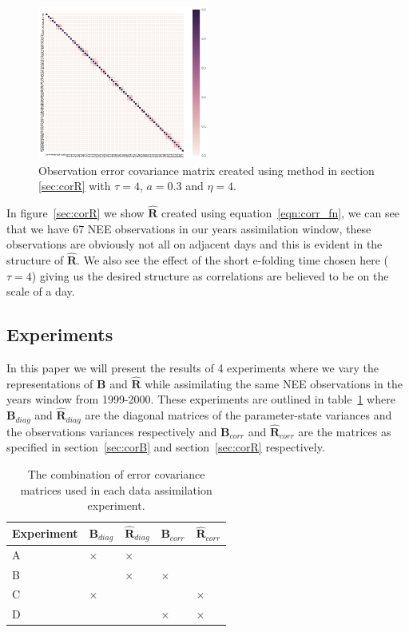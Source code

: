 \documentclass[11pt]{article}
\begin{document}
\begin{figure}[ht]
    \centering
    \includegraphics[width=0.5\textwidth]{b_edcr_corr_cor03_tau4_cutoff4_var05_rmat.png}
    \caption{Observation error covariance matrix created using method in section \ref{sec:corR} with $\tau = 4$, $a=0.3$ and $\eta=4$.}
    \label{fig:Rcorr}
\end{figure}

In figure~\ref{sec:corR} we show $\hat{\mathbf{R}}$ created using equation~\ref{eqn:corr_fn}, we can see that we have 67 NEE observations in our years assimilation window, these observations are obviously not all on adjacent days and this is evident in the structure of $\hat{\mathbf{R}}$. We also see the effect of the short e-folding time chosen here ($\tau=4$) giving us the desired structure as correlations are believed to be on the scale of a day. 

\subsection{Experiments} \label{sec:exps}

In this paper we will present the results of 4 experiments where we vary the representations of $\textbf{B}$ and $\hat{\mathbf{R}}$ while assimilating the same NEE observations in the years window from 1999-2000. These experiments are outlined in table~\ref{table:exps_tab} where $\textbf{B}_{diag}$ and $\hat{\mathbf{R}}_{diag}$ are the diagonal matrices of the parameter-state variances and the observations variances respectively and $\textbf{B}_{corr}$ and $\hat{\mathbf{R}}_{corr}$ are the matrices as specified in section~\ref{sec:corB} and section~\ref{sec:corR} respectively.

\begin{table}[ht] 
\begin{center}
	\begin{tabular}{| l | l | l | l | l |}
	\hline
	Experiment & $\textbf{B}_{diag}$ & $\hat{\mathbf{R}}_{diag}$ & $\textbf{B}_{corr}$ &
	$\hat{\mathbf{R}}_{corr}$ \\ \hline
	A & $\times$ & $\times$ & & \\ \hline
	B & & $\times$ & $\times$ & \\ \hline
	C & $\times$ & & & $\times$ \\ \hline
	D & & & $\times$ & $\times$ \\ 
	\hline
	\end{tabular}
	\caption{The combination of error covariance matrices used in each data assimilation experiment.}
	\label{table:exps_tab}
\end{center} 
\end{table}
\end{document}
